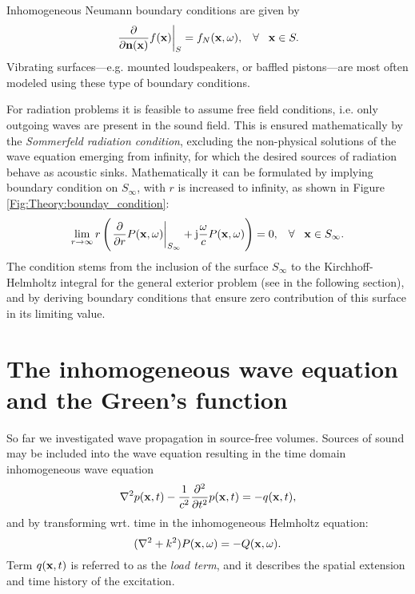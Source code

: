 \begin{itemize}
Inhomogeneous Neumann boundary conditions are given by
\begin{equation}
\left. \frac{\partial}{\partial \mathbf{n}(\mathbf{x})} f(\mathbf{x}) \right|_{S}= f_N(\mathbf{x},\omega), \hspace{3mm} \forall \hspace{3mm} \mathbf{x} \in S.
\end{equation}
Vibrating surfaces---e.g. mounted loudspeakers, or baffled pistons---are most often modeled using these type of boundary conditions.
\end{itemize}

For radiation problems it is feasible to assume free field conditions, i.e. only outgoing waves are present in the sound field. This is ensured mathematically by the \emph{Sommerfeld radiation condition}, excluding the non-physical solutions of the wave equation emerging from infinity, for which the desired sources of radiation behave as acoustic sinks.
Mathematically it can be formulated by implying boundary condition on $S_{\infty}$, with $r$ is increased to infinity, as shown in Figure \ref{Fig:Theory:bounday_condition}:
\begin{equation}
\lim_{r \rightarrow \infty} r \left( \left. \frac{\partial}{\partial r}P(\mathbf{x},\omega)\right|_{S_{\infty}} +\mathrm{j} \frac{\omega}{c}P(\mathbf{x},\omega) \right) = 0, \hspace{3mm} \forall \hspace{3mm} \mathbf{x} \in S_{\infty}.
\label{Eq:Theory:Sommerfeld_radiation_condition}
\end{equation}
The condition stems from the inclusion of the surface $S_{\infty}$ to the Kirchhoff-Helmholtz integral for the general exterior problem (see in the following section), and by deriving boundary conditions that ensure zero contribution of this surface in its limiting value\cite{Schot1992:Eighty_years, Williams1999}.

\newpage
\section{The inhomogeneous wave equation and the Green's function}

So far we investigated wave propagation in source-free volumes. Sources of sound may be included into the wave equation resulting in the time domain inhomogeneous wave equation
\begin{equation}
\nabla^2 p(\mathbf{x},t) -\frac{1}{c^2}\frac{\partial^2}{\partial t^2}p(\mathbf{x},t) = -q(\mathbf{x},t),
\label{Eq:Theory:Inhomogene_wave_eq_time_domain}
\end{equation}
and by transforming wrt. time in the inhomogeneous Helmholtz equation:
\begin{equation}
(\nabla^2 + k^2 ) P(\mathbf{x},\omega ) = -Q(\mathbf{x},\omega).
\end{equation}
Term $q(\mathbf{x},t)$ is referred to as the \emph{load term}, and it describes the spatial extension and time history of the excitation.

